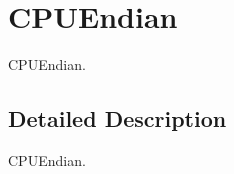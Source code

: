 \hypertarget{group__RTEMSScoreCPUlm32CPUEndian}{}\section{C\+P\+U\+Endian}
\label{group__RTEMSScoreCPUlm32CPUEndian}


C\+P\+U\+Endian.  




\subsection{Detailed Description}
C\+P\+U\+Endian. 

